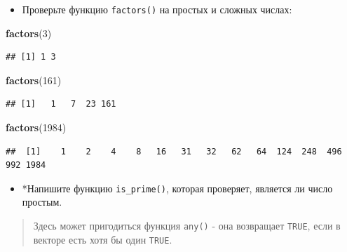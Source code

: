 \documentclass[]{book}
\newenvironment{Shaded}{\begin{snugshade}}{\end{snugshade}}
\newcommand{\KeywordTok}[1]{\textcolor[rgb]{0.13,0.29,0.53}{\textbf{#1}}}
\newcommand{\DecValTok}[1]{\textcolor[rgb]{0.00,0.00,0.81}{#1}}
\newcommand{\StringTok}[1]{\textcolor[rgb]{0.31,0.60,0.02}{#1}}
\newcommand{\CommentTok}[1]{\textcolor[rgb]{0.56,0.35,0.01}{\textit{#1}}}
\newcommand{\ControlFlowTok}[1]{\textcolor[rgb]{0.13,0.29,0.53}{\textbf{#1}}}
\newcommand{\OperatorTok}[1]{\textcolor[rgb]{0.81,0.36,0.00}{\textbf{#1}}}
\newcommand{\NormalTok}[1]{#1}
\providecommand{\tightlist}{%
  \setlength{\itemsep}{0pt}\setlength{\parskip}{0pt}}
\begin{document}
\begin{itemize}
\tightlist
\item
  Проверьте функцию \texttt{factors()} на простых и сложных числах:
\end{itemize}

\begin{Shaded}
\begin{Highlighting}[]
\KeywordTok{factors}\NormalTok{(}\DecValTok{3}\NormalTok{)}
\end{Highlighting}
\end{Shaded}

\begin{verbatim}
## [1] 1 3
\end{verbatim}

\begin{Shaded}
\begin{Highlighting}[]
\KeywordTok{factors}\NormalTok{(}\DecValTok{161}\NormalTok{)}
\end{Highlighting}
\end{Shaded}

\begin{verbatim}
## [1]   1   7  23 161
\end{verbatim}

\begin{Shaded}
\begin{Highlighting}[]
\KeywordTok{factors}\NormalTok{(}\DecValTok{1984}\NormalTok{)}
\end{Highlighting}
\end{Shaded}

\begin{verbatim}
##  [1]    1    2    4    8   16   31   32   62   64  124  248  496  992 1984
\end{verbatim}

\begin{itemize}
\tightlist
\item
  *Напишите функцию \texttt{is\_prime()}, которая проверяет, является ли
  число простым.
\end{itemize}

\begin{quote}
Здесь может пригодиться функция \texttt{any()} - она возвращает
\texttt{TRUE}, если в векторе есть хотя бы один \texttt{TRUE}.
\end{quote}

\begin{Shaded}
\end{Shaded}
\end{document}
